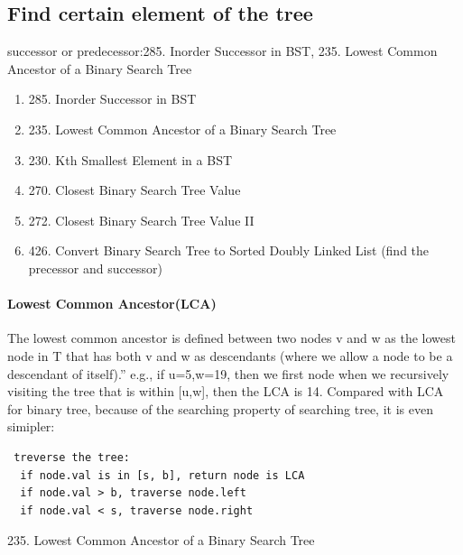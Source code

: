 \documentclass[../main.tex]{subfiles}
\begin{document}
\subsection{Find certain element of the tree}
successor or predecessor:285. Inorder Successor in BST, 235. Lowest Common Ancestor of a Binary Search Tree
\begin{enumerate} 
    \item 285. Inorder Successor in BST
    \item 235. Lowest Common Ancestor of a Binary Search Tree 
    \item 230. Kth Smallest Element in a BST
    \item 270. Closest Binary Search Tree Value
    \item 272. Closest Binary Search Tree Value II
    \item 426. Convert Binary Search Tree to Sorted Doubly Linked List (find the precessor and successor)
\end{enumerate}

\paragraph{Lowest Common Ancestor(LCA)} The lowest common ancestor is defined between two nodes v and w as the lowest node in T that has both v and w as descendants (where we allow a node to be a descendant of itself).” e.g., if u=5,w=19, then we first node when we recursively visiting the tree that is within [u,w], then the LCA is 14. Compared with LCA for binary tree, because of the searching property of searching tree, it is even simipler:
 \begin{lstlisting}
 treverse the tree:
  if node.val is in [s, b], return node is LCA
  if node.val > b, traverse node.left
  if node.val < s, traverse node.right
 \end{lstlisting}
 
 235. Lowest Common Ancestor of a Binary Search Tree
 
\end{document}
